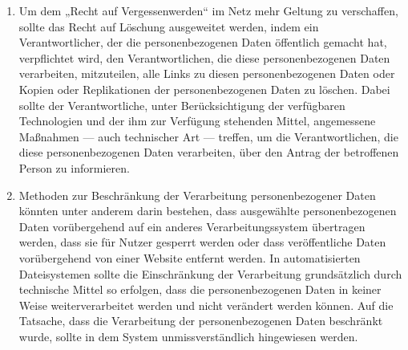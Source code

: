 \begin{enumerate}

   \item Um dem „Recht auf Vergessenwerden“ im Netz mehr Geltung zu verschaffen, sollte das Recht auf Löschung
    ausgeweitet werden, indem ein Verantwortlicher, der die personenbezogenen Daten öffentlich gemacht hat,
    verpflichtet wird, den Verantwortlichen, die diese personenbezogenen Daten verarbeiten, mitzuteilen, alle Links zu
    diesen personenbezogenen Daten oder Kopien oder Replikationen der personenbezogenen Daten zu löschen. Dabei sollte
    der Verantwortliche, unter Berücksichtigung der verfügbaren Technologien und der ihm zur Verfügung stehenden
    Mittel, angemessene Maßnahmen — auch technischer Art — treffen, um die Verantwortlichen, die diese
    personenbezogenen Daten verarbeiten, über den Antrag der betroffenen Person zu informieren.%
   \label{eg:66}
   

   \item Methoden zur Beschränkung der Verarbeitung personenbezogener Daten könnten unter anderem darin bestehen, dass
    ausgewählte personenbezogenen Daten vorübergehend auf ein anderes Verarbeitungssystem übertragen werden, dass sie
    für Nutzer gesperrt werden oder dass veröffentliche Daten vorübergehend von einer Website entfernt werden. In
    automatisierten Dateisystemen sollte die Einschränkung der Verarbeitung grundsätzlich durch technische Mittel so
    erfolgen, dass die personenbezogenen Daten in keiner Weise weiterverarbeitet werden und nicht verändert werden
    können. Auf die Tatsache, dass die Verarbeitung der personenbezogenen Daten beschränkt wurde, sollte in dem System
    unmissverständlich hingewiesen werden.%
   \label{eg:67}
   


\end{enumerate}
